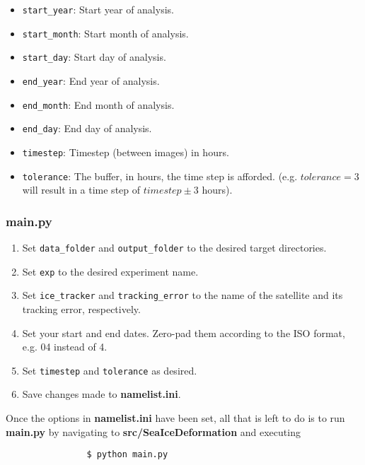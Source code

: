 \documentclass{article}
\begin{document}
\begin{itemize}
            \begin{itemize}
                \item \verb?start_year?: Start year of analysis.
                \item \verb?start_month?: Start month of analysis.
                \item \verb?start_day?: Start day of analysis.
                \item \verb?end_year?: End year of analysis.
                \item \verb?end_month?: End month of analysis.
                \item \verb?end_day?: End day of analysis.
                \item \verb?timestep?: Timestep (between images) in hours.
                \item \verb?tolerance?: The buffer, in hours, the time step is afforded. (e.g. $tolerance = 3$ will result in a time step of $timestep \pm 3$ hours).
            \end{itemize}
        \end{itemize}

        \subsubsection{\textbf{main.py}}

            \begin{enumerate}
                \item Set \verb?data_folder? and \verb?output_folder? to the desired target directories.
                \item Set \verb?exp? to the desired experiment name.
                \item Set \verb?ice_tracker? and \verb?tracking_error? to the name of the satellite and its tracking error, respectively.
                \item Set your start and end dates. Zero-pad them according to the ISO format, e.g. 04 instead of 4.
                \item Set \verb?timestep? and \verb?tolerance? as desired.
                \item Save changes made to \textbf{namelist.ini}.
            \end{enumerate}

            Once the options in \textbf{namelist.ini} have been set, all that is left to do is to run \textbf{main.py} by navigating to \textbf{src/SeaIceDeformation} and executing
            \begin{verbatim}
                $ python main.py
            \end{verbatim}
\end{document}
